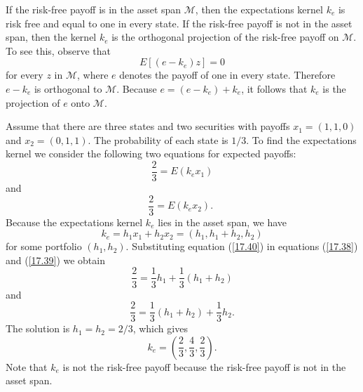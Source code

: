 \documentclass[\topdir/lecture\_notes.tex]{subfiles}
\begin{document}
If the risk-free payoff is in the asset span $\mathcal{M}$, then the expectations kernel $k_{e}$ is risk free and equal to one in every state. If the risk-free payoff is not in the asset span, then the kernel $k_{e}$ is the orthogonal projection of the risk-free payoff on $\mathcal{M}$. To see this, observe that
\begin{equation*}
E[(e-k_{e}) z]=0 
\end{equation*}
for every $z$ in $\mathcal{M}$, where $e$ denotes the payoff of one in every state. Therefore $e-k_{e}$ is orthogonal to $\mathcal{M}$. Because $e=\left(e-k_{e}\right)+k_{e}$, it follows that $k_{e}$ is the projection of $e$ onto $\mathcal{M}$.
\begin{example}\label{ex:expectations_kernel_example}
Assume that there are three states and two securities with payoffs $x_{1}=(1,1,0)$ and $x_{2}=(0,1,1)$. The probability of each state is $1 / 3$.
To find the expectations kernel we consider the following two equations for expected payoffs:
\begin{equation}
\frac{2}{3}=E\left(k_{e} x_{1}\right) \label{17.38}
\end{equation}
and
\begin{equation}
\frac{2}{3}=E\left(k_{e} x_{2}\right) \text {. } \label{17.39}
\end{equation}
Because the expectations kernel $k_{e}$ lies in the asset span, we have
\begin{equation}
k_{e}=h_{1} x_{1}+h_{2} x_{2}=\left(h_{1}, h_{1}+h_{2}, h_{2}\right) \label{17.40}
\end{equation}
for some portfolio $\left(h_{1}, h_{2}\right)$. Substituting equation (\ref{17.40}) in equations (\ref{17.38}) and (\ref{17.39}) we obtain
\begin{equation*}
\frac{2}{3}=\frac{1}{3} h_{1}+\frac{1}{3}\left(h_{1}+h_{2}\right) 
\end{equation*}
and
\begin{equation*}
\frac{2}{3}=\frac{1}{3}\left(h_{1}+h_{2}\right)+\frac{1}{3} h_{2} . 
\end{equation*}
The solution is $h_{1}=h_{2}=2 / 3$, which gives
\begin{equation*}
k_{e}=\left(\frac{2}{3}, \frac{4}{3}, \frac{2}{3}\right). 
\end{equation*}
Note that $k_{e}$ is not the risk-free payoff because the risk-free payoff is not in the asset span.
\end{example}
\end{document}
